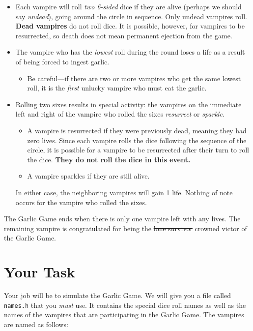 \documentclass[11pt]{article}
\begin{document}
\begin{itemize}
  \item Each vampire will roll \emph{two 6-sided} dice if they are alive (perhaps we should say
\emph{undead}), going
    around the circle in sequence. Only undead vampires roll. \textbf{Dead
    vampires} do not roll dice. It is possible, however, for vampires to be
    resurrected, so death does not mean permanent ejection from the game.
  \item The vampire who has the \emph{lowest} roll during the round loses a
    life as a result of being forced to ingest garlic.
    \begin{itemize}
      \item Be careful---if there are two or more vampires who get the same
        lowest roll, it is the \emph{first} unlucky vampire who must eat the
        garlic.
    \end{itemize}
  \item Rolling two sixes results in special activity: the vampires on the
    immediate left and right of the vampire who rolled the sixes
    \emph{resurrect} or \emph{sparkle}.
    \begin{itemize}
      \item A vampire is resurrected if they were previously dead, meaning they
        had zero lives. Since each vampire rolls the dice following the sequence
        of the circle, it is possible for a vampire to be resurrected after
        their turn to roll the dice. \textbf{They do not roll the dice in this
        event.}
      \item A vampire sparkles if they are still alive.
    \end{itemize}
    In either case, the neighboring vampires will gain 1 life. Nothing of note
    occurs for the vampire who rolled the sixes.
\end{itemize}

The Garlic Game ends when there is only one vampire left with any lives. The
remaining vampire is congratulated for being the \st{lone survivor} crowned
victor of the Garlic Game.


\section{Your Task}

Your job will be to simulate the Garlic Game. We will give you a file called
\texttt{names.h} that you \emph{must} use. It contains the special dice roll
names as well as the names of the vampires that are participating in the Garlic
Game. The vampires are named as follows:
\end{document}
